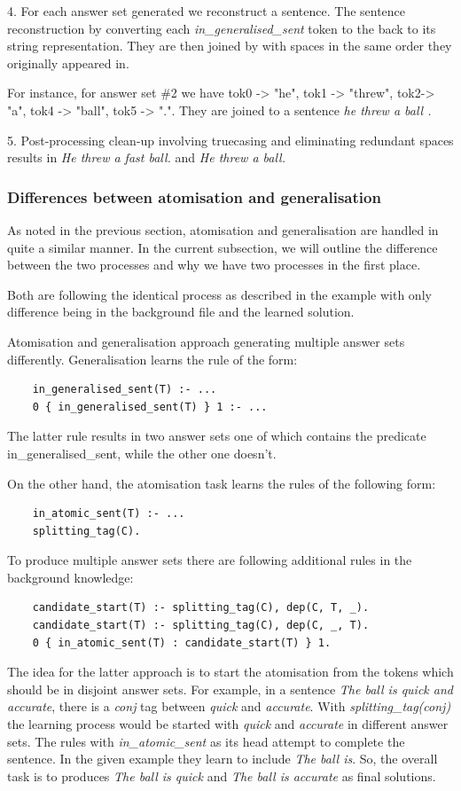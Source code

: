 4. For each answer set generated we reconstruct a sentence. 
The sentence reconstruction by converting each \textit{in\_generalised\_sent} token to the back to its string representation.
They are then joined by with spaces in the same order they originally appeared in.

For instance, for answer set \#2 we have tok0 -> "he", tok1 -> "threw", tok2-> "a", tok4 -> "ball", tok5 -> ".".
They are joined to a sentence \textit{he threw a ball .}

5. Post-processing clean-up involving truecasing and eliminating redundant spaces results in \emph{He threw a fast ball.} and \emph{He threw a ball.} \\



\subsubsection{Differences between atomisation and generalisation}

As noted in the previous section, atomisation and generalisation are handled in quite a similar manner.
In the current subsection, we will outline the difference between the two processes and why we have two processes in the first place.

Both are following the identical process as described in the example with only difference being in the background file and the learned solution.

Atomisation and generalisation approach generating multiple answer sets differently.
Generalisation learns the rule of the form: 
\begin{verbatim}
    in_generalised_sent(T) :- ...
    0 { in_generalised_sent(T) } 1 :- ...
\end{verbatim}
The latter rule results in two answer sets one of which contains the predicate in\_generalised\_sent, while the other one doesn't.

On the other hand, the atomisation task learns the rules of the following form:
\begin{verbatim}
    in_atomic_sent(T) :- ...
    splitting_tag(C).
\end{verbatim}
To produce multiple answer sets there are following additional rules in the background knowledge:
\begin{verbatim}
    candidate_start(T) :- splitting_tag(C), dep(C, T, _).
    candidate_start(T) :- splitting_tag(C), dep(C, _, T).
    0 { in_atomic_sent(T) : candidate_start(T) } 1.
\end{verbatim}
The idea for the latter approach is to start the atomisation from the tokens which should be in disjoint answer sets.
For example, in a sentence \emph{The ball is quick and accurate}, there is a \emph{conj} tag between \emph{quick} and \emph{accurate}.
With \emph{splitting\_tag(conj)} the learning process would be started with \emph{quick} and \emph{accurate} in different answer sets.
The rules with \emph{in\_atomic\_sent} as its head attempt to complete the sentence.
In the given example they learn to include \emph{The ball is}.
So, the overall task is to produces \emph{The ball is quick} and \emph{The ball is accurate} as final solutions.


